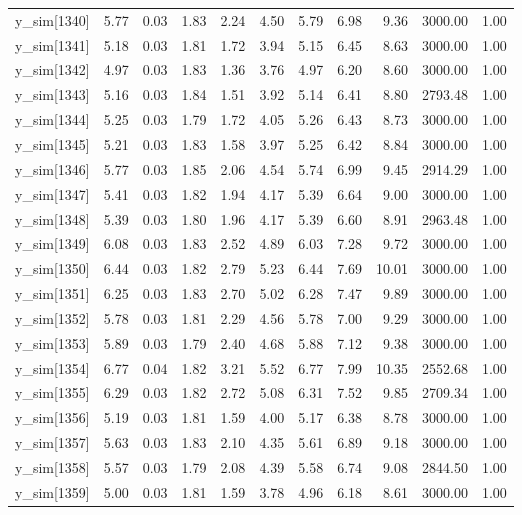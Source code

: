 \begin{table}[ht]
\begin{tabular}{rrrrrrrrrrr}
  y\_sim[1340] & 5.77 & 0.03 & 1.83 & 2.24 & 4.50 & 5.79 & 6.98 & 9.36 & 3000.00 & 1.00 \\ 
  y\_sim[1341] & 5.18 & 0.03 & 1.81 & 1.72 & 3.94 & 5.15 & 6.45 & 8.63 & 3000.00 & 1.00 \\ 
  y\_sim[1342] & 4.97 & 0.03 & 1.83 & 1.36 & 3.76 & 4.97 & 6.20 & 8.60 & 3000.00 & 1.00 \\ 
  y\_sim[1343] & 5.16 & 0.03 & 1.84 & 1.51 & 3.92 & 5.14 & 6.41 & 8.80 & 2793.48 & 1.00 \\ 
  y\_sim[1344] & 5.25 & 0.03 & 1.79 & 1.72 & 4.05 & 5.26 & 6.43 & 8.73 & 3000.00 & 1.00 \\ 
  y\_sim[1345] & 5.21 & 0.03 & 1.83 & 1.58 & 3.97 & 5.25 & 6.42 & 8.84 & 3000.00 & 1.00 \\ 
  y\_sim[1346] & 5.77 & 0.03 & 1.85 & 2.06 & 4.54 & 5.74 & 6.99 & 9.45 & 2914.29 & 1.00 \\ 
  y\_sim[1347] & 5.41 & 0.03 & 1.82 & 1.94 & 4.17 & 5.39 & 6.64 & 9.00 & 3000.00 & 1.00 \\ 
  y\_sim[1348] & 5.39 & 0.03 & 1.80 & 1.96 & 4.17 & 5.39 & 6.60 & 8.91 & 2963.48 & 1.00 \\ 
  y\_sim[1349] & 6.08 & 0.03 & 1.83 & 2.52 & 4.89 & 6.03 & 7.28 & 9.72 & 3000.00 & 1.00 \\ 
  y\_sim[1350] & 6.44 & 0.03 & 1.82 & 2.79 & 5.23 & 6.44 & 7.69 & 10.01 & 3000.00 & 1.00 \\ 
  y\_sim[1351] & 6.25 & 0.03 & 1.83 & 2.70 & 5.02 & 6.28 & 7.47 & 9.89 & 3000.00 & 1.00 \\ 
  y\_sim[1352] & 5.78 & 0.03 & 1.81 & 2.29 & 4.56 & 5.78 & 7.00 & 9.29 & 3000.00 & 1.00 \\ 
  y\_sim[1353] & 5.89 & 0.03 & 1.79 & 2.40 & 4.68 & 5.88 & 7.12 & 9.38 & 3000.00 & 1.00 \\ 
  y\_sim[1354] & 6.77 & 0.04 & 1.82 & 3.21 & 5.52 & 6.77 & 7.99 & 10.35 & 2552.68 & 1.00 \\ 
  y\_sim[1355] & 6.29 & 0.03 & 1.82 & 2.72 & 5.08 & 6.31 & 7.52 & 9.85 & 2709.34 & 1.00 \\ 
  y\_sim[1356] & 5.19 & 0.03 & 1.81 & 1.59 & 4.00 & 5.17 & 6.38 & 8.78 & 3000.00 & 1.00 \\ 
  y\_sim[1357] & 5.63 & 0.03 & 1.83 & 2.10 & 4.35 & 5.61 & 6.89 & 9.18 & 3000.00 & 1.00 \\ 
  y\_sim[1358] & 5.57 & 0.03 & 1.79 & 2.08 & 4.39 & 5.58 & 6.74 & 9.08 & 2844.50 & 1.00 \\ 
  y\_sim[1359] & 5.00 & 0.03 & 1.81 & 1.59 & 3.78 & 4.96 & 6.18 & 8.61 & 3000.00 & 1.00 \\ 

\end{tabular}
\end{table}
